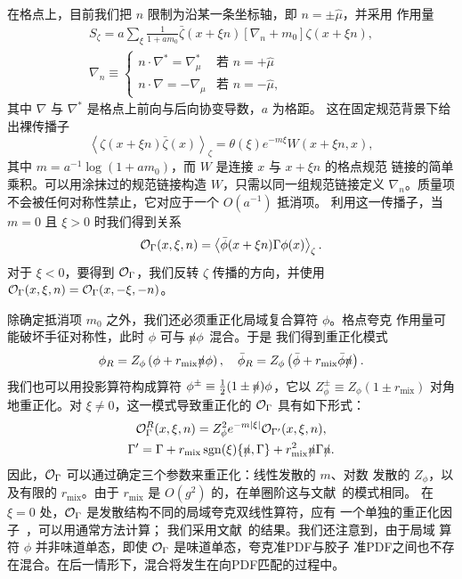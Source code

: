 在格点上，目前我们把 $n$ 限制为沿某一条坐标轴，即 $n=\pm\hat\mu$，并采用
作用量
\begin{equation}
\begin{gathered}
  S_\zeta = a\sum_\xi\frac{1}{1+am_0}\bar\zeta(x+\xi n)\left[\nabla_n+m_0\right]\zeta(x+\xi n),\\
\nabla_n\equiv\begin{cases}
n\cdot\nabla^* = \nabla^*_\mu & \text{若 }n=+\hat\mu \\
n\cdot\nabla = -\nabla_\mu & \text{若 }n=-\hat\mu,
\end{cases}
\end{gathered}
\end{equation}
其中 $\nabla$ 与 $\nabla^*$ 是格点上前向与后向协变导数，$a$ 为格距。
这在固定规范背景下给出裸传播子
\begin{equation}
  \left\langle \zeta(x+\xi n)\bar\zeta(x)\right\rangle_\zeta = \theta(\xi)e^{-m\xi}W(x+\xi n,x),
\end{equation}
其中 $m=a^{-1}\log(1+am_0)$，而 $W$ 是连接 $x$ 与 $x+\xi n$ 的格点规范
链接的简单乘积。可以用涂抹过的规范链接构造 $W$，只需以同一组规范链接定义
$\nabla_n$。质量项不会被任何对称性禁止，它对应于一个 $O(a^{-1})$ 抵消项。
利用这一传播子，当 $m=0$ 且 $\xi>0$ 时我们得到关系
\begin{equation}
  \mathcal{O}_\Gamma(x,\xi,n) = \left\langle \bar\phi(x+\xi n)\Gamma \phi(x) \right\rangle_\zeta.
\end{equation}
对于 $\xi<0$，要得到 $\mathcal{O}_\Gamma$，我们反转 $\zeta$ 传播的方向，并使用
$\mathcal{O}_\Gamma(x,\xi,n)=\mathcal{O}_\Gamma(x,-\xi,-n)$。

除确定抵消项 $m_0$ 之外，我们还必须重正化局域复合算符 $\phi$。格点夸克
作用量可能破坏手征对称性，此时 $\phi$ 可与 $\slashed{n}\phi$ 混合。于是
我们得到重正化模式
\begin{equation}
  \phi_R = Z_\phi\left(\phi+r_\text{mix}\slashed{n}\phi\right),\quad
  \bar\phi_R = Z_\phi\left(\bar\phi+r_\text{mix}\bar\phi\slashed{n}\right).
\end{equation}
我们也可以用投影算符构成算符
$\phi^\pm\equiv\frac{1}{2}(1\pm\slashed{n})\phi$，它以
$Z_\phi^\pm\equiv Z_\phi(1\pm r_\text{mix})$ 对角地重正化。对
$\xi\neq 0$，这一模式导致重正化的 $\mathcal{O}_\Gamma$ 具有如下形式：
\begin{equation}
\begin{gathered}
  \mathcal{O}_\Gamma^R(x,\xi,n) = Z_\phi^2e^{-m|\xi|}\mathcal{O}_{\Gamma'}(x,\xi,n),\\
\Gamma' = \Gamma + r_\text{mix}\operatorname{sgn}(\xi)\{\slashed{n},\Gamma\} + r_\text{mix}^2\slashed{n}\Gamma\slashed{n}.
\end{gathered}
\end{equation}
因此，$\mathcal{O}_\Gamma$ 可以通过确定三个参数来重正化：线性发散的 $m$、对数
发散的 $Z_\phi$，以及有限的 $r_\text{mix}$。由于 $r_\text{mix}$ 是
$O(g^2)$ 的，在单圈阶这与文献~\cite{Constantinou:2017sej}的模式相同。
在 $\xi=0$ 处，$\mathcal{O}_\Gamma$ 是发散结构不同的局域夸克双线性算符，应有
一个单独的重正化因子~\cite{Constantinou_privcomm}，可以用通常方法计算；
我们采用文献~\cite{Alexandrou:2015sea}的结果。我们还注意到，由于局域
算符 $\phi$ 并非味道单态，即使 $\mathcal{O}_\Gamma$ 是味道单态，夸克准PDF与胶子
准PDF之间也不存在混合。在后一情形下，混合将发生在向PDF匹配的过程中。

